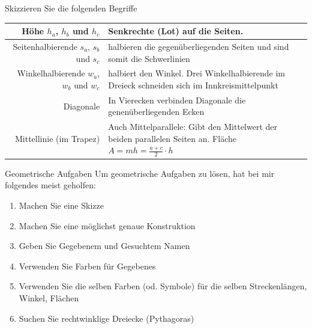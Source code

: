 Skizzieren Sie die folgenden Begriffe

\begin{tabular}{rp{90mm}}
  Höhe $h_a$, $h_b$ und $h_c$ & Senkrechte (Lot) auf die Seiten.\\\hline
  
    Seitenhalbierende\index{Seitenhalbierende} $s_a$, $s_b$ und $s_c$ & halbieren die
  gegenüberliegenden Seiten und sind somit die
  Schwerlinien\index{Schwerlinie}\\\hline

  Winkelhalbierende $w_a$, $w_b$ und $w_c$ & halbiert den Winkel. Drei
    Winkelhalbierende im Dreieck schneiden sich im Innkreismittelpunkt\\\hline
  
  Diagonale & In Vierecken verbinden Diagonale die genenüberliegenden
  Ecken\\\hline

  Mittellinie (im Trapez) & Auch Mittelparallele: Gibt den Mittelwert
  der beiden parallelen Seiten an. Fläche $A = mh = \frac{a+c}2\cdot{}h$
\end{tabular}






\begin{rezept}{Geometrische Aufgaben}{}
Um geometrische Aufgaben zu lösen, hat bei mir folgendes meist geholfen:

\begin{enumerate}
\item Machen Sie eine Skizze
\item Machen Sie eine möglichst genaue Konstruktion
\item Geben Sie Gegebenem und Gesuchtem Namen
\item Verwenden Sie Farben für Gegebenes
\item Verwenden Sie die selben Farben (od. Symbole) für die selben Streckenlängen, Winkel, Flächen
\item Suchen Sie rechtwinklige Dreiecke (Pythagoras)

\end{enumerate}
\end{rezept}


